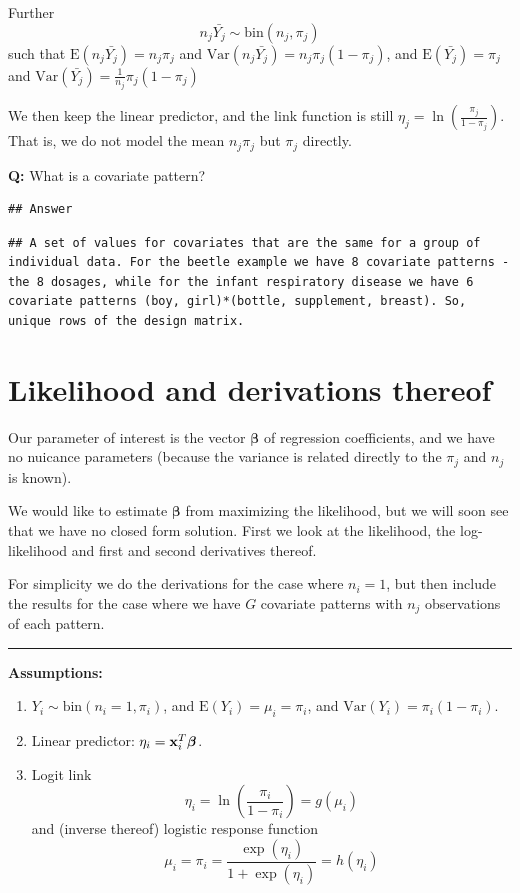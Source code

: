 \documentclass[
]{article}
\begin{document}
Further \[ n_j\bar{Y_j} \sim \text{bin}(n_j,\pi_j)\] such that
\(\text{E}(n_j\bar{Y_j})=n_j \pi_j\) and
\(\text{Var}(n_j\bar{Y_j})=n_j \pi_j(1-\pi_j)\), and
\(\text{E}(\bar{Y_j})=\pi_j\) and
\(\text{Var}(\bar{Y_j})=\frac{1}{n_j} \pi_j(1-\pi_j)\)

We then keep the linear predictor, and the link function is still
\(\eta_j=\ln(\frac{\pi_j}{1-\pi_j})\). That is, we do not model the mean
\(n_j \pi_j\) but \(\pi_j\) directly.

\textbf{Q:} What is a covariate pattern?

\begin{verbatim}
## Answer
\end{verbatim}

\begin{verbatim}
## A set of values for covariates that are the same for a group of individual data. For the beetle example we have 8 covariate patterns - the 8 dosages, while for the infant respiratory disease we have 6 covariate patterns (boy, girl)*(bottle, supplement, breast). So, unique rows of the design matrix.
\end{verbatim}

\hypertarget{likelihood-and-derivations-thereof}{%
\section{Likelihood and derivations
thereof}\label{likelihood-and-derivations-thereof}}

Our parameter of interest is the vector \(\boldsymbol{\beta}\) of
regression coefficients, and we have no nuicance parameters (because the
variance is related directly to the \(\pi_j\) and \(n_j\) is known).

We would like to estimate \(\boldsymbol{\beta}\) from maximizing the
likelihood, but we will soon see that we have no closed form solution.
First we look at the likelihood, the log-likelihood and first and second
derivatives thereof.

For simplicity we do the derivations for the case where \(n_i=1\), but
then include the results for the case where we have \(G\) covariate
patterns with \(n_j\) observations of each pattern.

\begin{center}\rule{0.5\linewidth}{0.5pt}\end{center}

\textbf{Assumptions:}

\begin{enumerate}
\def\labelenumi{\arabic{enumi}.}
\item
  \(Y_i \sim \text{bin}(n_i=1,\pi_i)\), and
  \(\text{E}(Y_i)=\mu_i=\pi_i\), and \(\text{Var}(Y_i)=\pi_i(1-\pi_i)\).
\item
  Linear predictor: \(\eta_i={\bf x}_i^T \boldsymbol{\beta}\).
\item
  Logit link \[\eta_i=\ln(\frac{\pi_i}{1-\pi_i})=g(\mu_i)\] and (inverse
  thereof) logistic response function
  \[\mu_i=\pi_i=\frac{\exp(\eta_i)}{1+\exp(\eta_i)}=h(\eta_i)\]
\end{enumerate}
\end{document}
